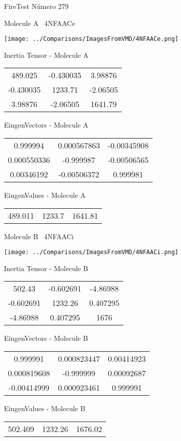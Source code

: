 \vtab[-3cm]
\begin{center}
{\large FireTest \tab Número 279}
\end{center}
\begin{multicols}{2}
\begin{center}

Molecule A \
4NFAACe

\texttt{[image: ../Comparisons/ImagesFromVMD/4NFAACe.png]}

Inertia Tensor - Molecule A \\
\begin{tabular}{|c c c|}
489.025	 & 	-0.430035	 & 	3.98876	 \\
-0.430035	 & 	1233.71	 & 	-2.06505	 \\
3.98876	 & 	-2.06505	 & 	1641.79
\end{tabular}

\vtab
 EingenVectors - Molecule A     \\
\begin{tabular}{|c c c|}
0.999994	 & 	0.000567863	 & 	-0.00345908	 \\
0.000550336	 & 	-0.999987	 & 	-0.00506565	 \\
0.00346192	 & 	-0.00506372	 & 	0.999981
\end{tabular}

\vtab
 EingenValues - Molecule A     \\
\begin{tabular}{|c c c|}
489.011	 & 	1233.7	 & 	1641.81	 \\
\end{tabular}
\columnbreak

Molecule B \
4NFAACi

\texttt{[image: ../Comparisons/ImagesFromVMD/4NFAACi.png]}

Inertia Tensor - Molecule B \\
\begin{tabular}{|c c c|}
502.43	 & 	-0.602691	 & 	-4.86988	 \\
-0.602691	 & 	1232.26	 & 	0.407295	 \\
-4.86988	 & 	0.407295	 & 	1676
\end{tabular}

\vtab
 EingenVectors - Molecule B     \\
\begin{tabular}{|c c c|}
0.999991	 & 	0.000823447	 & 	0.00414923	 \\
0.000819608	 & 	-0.999999	 & 	0.00092687	 \\
-0.00414999	 & 	0.000923461	 & 	0.999991
\end{tabular}

\vtab
 EingenValues - Molecule B     \\
\begin{tabular}{|c c c|}
502.409	 & 	1232.26	 & 	1676.02	 \\
\end{tabular}

\end{center}
\end{multicols}

